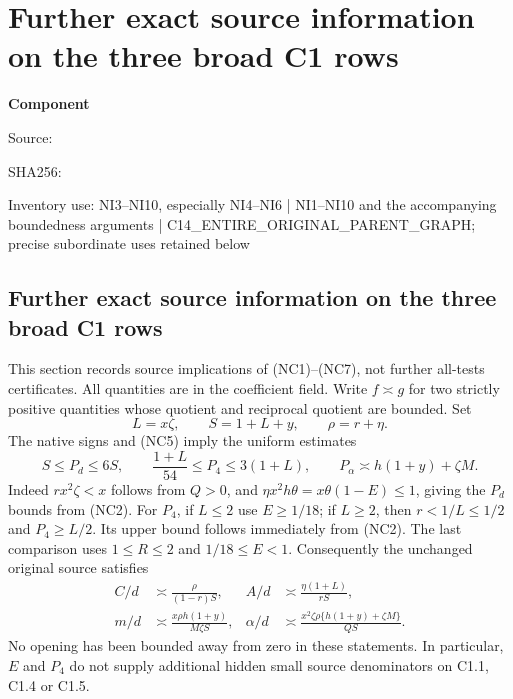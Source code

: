 \chapter{Further exact source information on the three broad C1 rows}
\label{component:p51451360ff4a}
\noindent\textbf{Component }\par
{\small\noindent Source: \par}
{\small\noindent SHA256: \par}
{\small\noindent Inventory use: NI3--NI10, especially NI4--NI6 | NI1--NI10 and the accompanying boundedness arguments | C14\_\allowbreak{}ENTIRE\_\allowbreak{}ORIGINAL\_\allowbreak{}PARENT\_\allowbreak{}GRAPH; precise subordinate uses retained below\par}
\medskip
\section[Further exact source information on the three broad C1 rows]{Further exact source information on the three broad C1 rows}
\label{p51451360ff4a:sec:c1-residual-source-implications}

This section records source implications of (NC1)--(NC7), not further
all-tests certificates. All quantities are in the coefficient field.
Write $f\asymp g$ for two strictly positive quantities whose quotient
and reciprocal quotient are bounded. Set
\[
             L=x\zeta,\qquad S=1+L+y,\qquad \rho=r+\eta.
\]
The native signs and (NC5) imply the uniform estimates
\[
 S\le P_d\le6S,\qquad
 \frac{1+L}{54}\le P_4\le3(1+L),\qquad
 P_\alpha\asymp h(1+y)+\zeta M.                 \tag{NI1}
\]
Indeed $rx^2\zeta<x$ follows from $Q>0$, and
$\eta x^2h\theta=x\theta(1-E)\le1$, giving the $P_d$ bounds
from (NC2). For $P_4$, if $L\le2$ use $E\ge1/18$; if $L\ge2$,
then $r<1/L\le1/2$ and $P_4\ge L/2$. Its upper bound follows
immediately from (NC2). The last comparison uses $1\le R\le2$
and $1/18\le E<1$.
Consequently the unchanged original source satisfies
\begin{align*}
 C/d&\asymp\frac{\rho}{(1-r)S},&
 A/d&\asymp\frac{\eta(1+L)}{rS},\\
 m/d&\asymp\frac{x\rho h(1+y)}{M\zeta S},&
 \alpha/d&\asymp
 \frac{x^2\zeta\rho\{h(1+y)+\zeta M\}}{QS}.
 \tag{NI2}
\end{align*}
No opening has been bounded away from zero in these statements.
In particular, $E$ and $P_4$ do not supply additional hidden small
source denominators on C1.1, C1.4 or C1.5.

